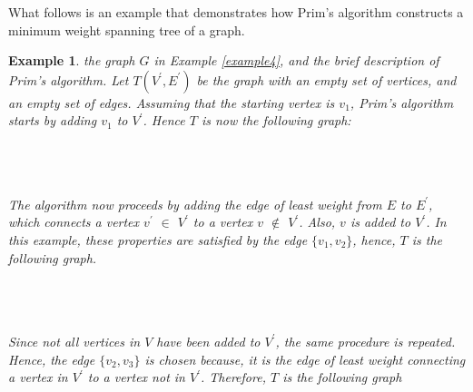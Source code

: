 \documentclass[12pt]{article}
\newtheorem{example}[definition]{Example}
\numberwithin{equation}{subsection}
\numberwithin{table}{subsection}
\begin{document}
What follows is an example that demonstrates how Prim's algorithm constructs a minimum weight spanning tree of a graph.
\begin{example}
\label{example_prim}
 the graph $G$ in Example \ref{example4}, and the brief description of Prim's algorithm. Let $T(V^\prime,E^\prime)$ be the graph with an empty set of vertices, and an empty set of edges. Assuming that the starting vertex is $v_1$, Prim's algorithm starts by adding $v_1$ to $V^\prime$. Hence $T$ is now the following graph:\\\\
\\\\
The algorithm now proceeds by adding the edge of least weight from $E$ to $E^\prime$, which connects a vertex $v^\prime$ $\in$ $V^\prime$ to a vertex $v$ $\notin$ $V^\prime$. Also, $v$ is added to $V^\prime$. In this example, these properties are satisfied by the edge $\{v_1, v_2\}$, hence, $T$ is the following graph.\\\\
\\\\
Since not all vertices in $V$ have been added to $V^\prime$, the same procedure is repeated. Hence, the edge $\{v_2, v_3\}$ is chosen because, it is the edge of least weight connecting a vertex in $V^\prime$ to a vertex not in $V^\prime$. Therefore, $T$ is the following graph\\\\
\begin{tikzpicture}[
    > = , %
    shorten > = 1pt, %
    auto,
    node distance = 3cm, %
    semithick %
    ]


\end{tikzpicture}
\end{example}
\end{document}

